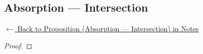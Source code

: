 
\subsection*{Absorption --- Intersection}
\label{prf:absorption-cap}

\begin{remark*}[Return]
\hyperref[prop:absorption-cap]{$\leftarrow$ Back to Proposition (Absorption --- Intersection) in Notes}
\end{remark*}

\begin{proof}
\end{proof}

\begin{remark*}

\end{remark*}

\begin{remark*}[Dependencies]

\FlashUses{}
\end{remark*}

